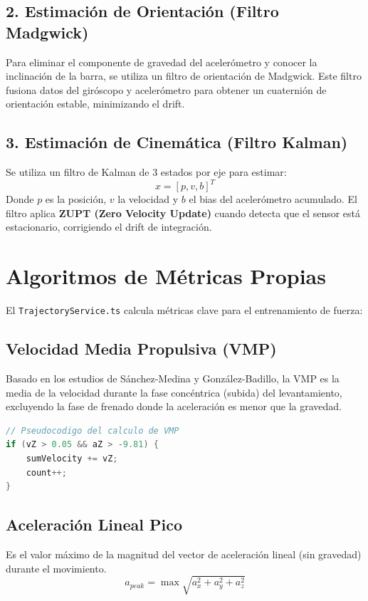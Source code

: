 \documentclass[11pt,a4paper,oneside]{article}
\begin{document}
\subsection{2. Estimación de Orientación (Filtro Madgwick)}
Para eliminar el componente de gravedad del acelerómetro y conocer la inclinación de la barra, se utiliza un filtro de orientación de Madgwick. Este filtro fusiona datos del giróscopo y acelerómetro para obtener un cuaternión de orientación estable, minimizando el drift.

\subsection{3. Estimación de Cinemática (Filtro Kalman)}
Se utiliza un filtro de Kalman de 3 estados por eje para estimar:
\begin{equation}
    x = [p, v, b]^T
\end{equation}
Donde $p$ es la posición, $v$ la velocidad y $b$ el bias del acelerómetro acumulado. El filtro aplica \textbf{ZUPT (Zero Velocity Update)} cuando detecta que el sensor está estacionario, corrigiendo el drift de integración.

\section{Algoritmos de Métricas Propias}
El \texttt{TrajectoryService.ts} calcula métricas clave para el entrenamiento de fuerza:

\subsection{Velocidad Media Propulsiva (VMP)}
Basado en los estudios de Sánchez-Medina y González-Badillo, la VMP es la media de la velocidad durante la fase concéntrica (subida) del levantamiento, excluyendo la fase de frenado donde la aceleración es menor que la gravedad.
\begin{lstlisting}[language=Java]
// Pseudocodigo del calculo de VMP
if (vZ > 0.05 && aZ > -9.81) {
    sumVelocity += vZ;
    count++;
}
\end{lstlisting}

\subsection{Aceleración Lineal Pico}
Es el valor máximo de la magnitud del vector de aceleración lineal (sin gravedad) durante el movimiento.
\begin{equation}
    a_{peak} = \max \sqrt{a_x^2 + a_y^2 + a_z^2}
\end{equation}
\end{document}
